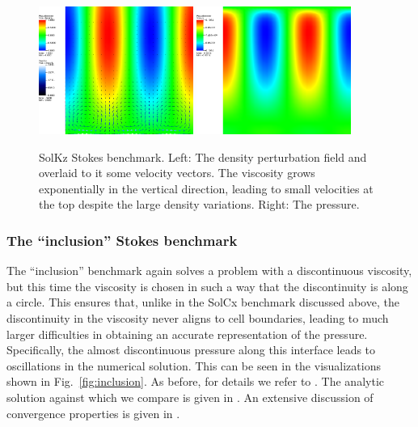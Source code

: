 \documentclass{article}
\begin{document}
\begin{figure}
  \begin{center}
    \includegraphics[width=0.45\textwidth]{cookbooks/benchmarks/solkz-solution}
    \hfill
    \includegraphics[width=0.45\textwidth]{cookbooks/benchmarks/solkz-solution-pressure}
    \caption{SolKz Stokes benchmark. Left: The density perturbation field and
      overlaid to it some velocity vectors. The viscosity grows exponentially
      in the vertical direction, leading to small velocities at the top
      despite the large density variations. Right: The
      pressure.}
    \label{fig:solkz}
  \end{center}
\end{figure}


\subsubsection{The ``inclusion'' Stokes benchmark}
\label{sec:benchmark-inclusion}

The ``inclusion'' benchmark again solves a problem with a discontinuous
viscosity, but this time the viscosity is chosen in such a way that the
discontinuity is along a circle. This ensures that, unlike in the SolCx
benchmark discussed above, the discontinuity in the viscosity never aligns to
cell boundaries, leading to much larger difficulties in obtaining an accurate
representation of the pressure. Specifically, the almost discontinuous
pressure along this interface leads to oscillations in the numerical
solution. This can be seen in the visualizations shown in
Fig.~\ref{fig:inclusion}. As before, for details we refer to
\cite{DMGT11}. The analytic solution against which we compare is given in
\cite{SP03}. An extensive discussion of convergence properties is given in
\cite{KHB12}.
\end{document}
